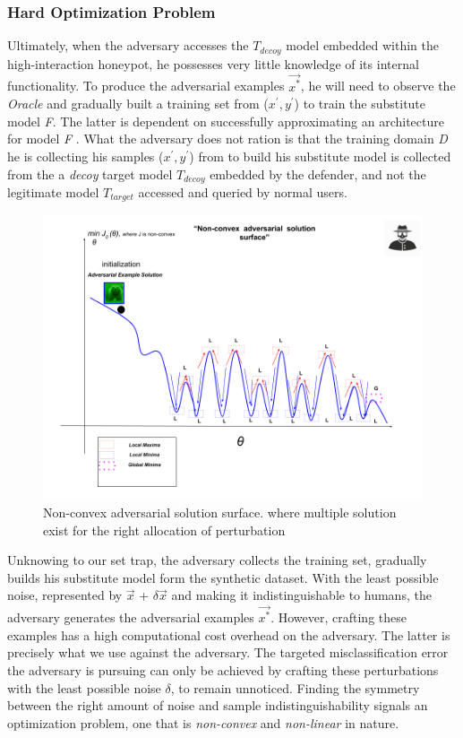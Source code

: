 \documentclass[grad,lot,lof,11pt,oneside,onehalfspace]{RUthesis}
\begin{document}
\subsubsection{Hard Optimization Problem} 
Ultimately, when the adversary accesses the \textit{$T_{decoy}$} model embedded within the high-interaction honeypot, he possesses very little knowledge of its internal functionality. To produce the adversarial examples \textit{$\vec{x^{*}}$}, he will need to observe the \textit{Oracle} and gradually built a training set from ($x^{'},y^{'}$) to train the substitute model \textit{F}. The latter is dependent on successfully approximating an architecture for model \textit{F} . What the adversary does not ration is that the training domain \textit{D} he is collecting his samples ($x^{'},y^{'}$) from to build his substitute model is collected from the a \textit{decoy} target model \textit{$T_{decoy}$} embedded by the defender, and not the legitimate model \textit{$T_{target}$} accessed and queried by normal users.
\begin{figure}[h]
	\centering
	\includegraphics[width=0.8\linewidth]{"Images/Chapter 4/nonconvexSol"}
	\caption{Non-convex adversarial solution surface. where multiple solution exist for the right allocation of perturbation}
	\label{fig:nonconvexSol}
\end{figure}
Unknowing to our set trap, the adversary collects the training set, gradually builds his substitute model form the synthetic dataset. With the least possible noise, represented by $\vec{x}$ + $\delta\vec{x}$ and making it indistinguishable to humans, the adversary generates the adversarial examples \textit{$\vec{x^{*}}$}. However, crafting these examples has a high computational cost overhead on the adversary. The latter is precisely what we use against the adversary. The targeted misclassification error the adversary is pursuing can only be achieved by crafting these perturbations with the least possible noise $\delta$, to remain unnoticed. Finding the symmetry between the right amount of noise and sample indistinguishability signals an optimization problem, one that is \textit{non-convex} and \textit{non-linear} in nature. 
\end{document}
